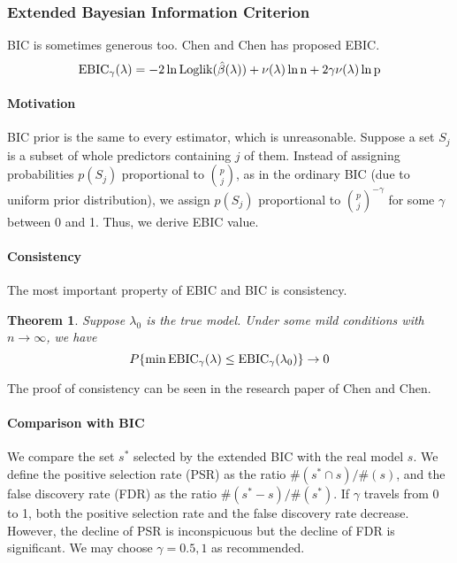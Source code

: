 \documentclass[]{article}
\newtheorem{mythm}{Theorem}%
\begin{document}
\subsubsection{Extended Bayesian Information Criterion}
BIC is sometimes generous too. Chen and Chen has proposed EBIC.
\begin{equation}
\rm EBIC_\gamma(\lambda)=-2\ln \rm Loglik(\hat{\beta}(\lambda))+\nu(\lambda) \ln n+2\gamma\nu(\lambda)\ln p
\end{equation}

\paragraph{Motivation}
BIC prior is the same to every estimator, which is unreasonable. Suppose a set $ S_j $ is a subset of whole predictors containing $ j $ of them. Instead of assigning probabilities $p(S_j)$ proportional to $ \binom{p}{j} $, as in the ordinary BIC (due to uniform prior distribution), we assign $p(S_j)$ proportional to $ \binom{p}{j}^{-\gamma} $ for some $\gamma$ between 0 and 1. Thus, we derive EBIC value.

\paragraph{Consistency}
The most important property of EBIC and BIC is consistency.
\begin{mythm}
	Suppose $ \lambda_0  $ is the true model. Under some mild conditions with $ n\rightarrow \infty $, we have
	\begin{equation}
	P\{\min \rm EBIC_\gamma (\lambda)\leq \rm EBIC_\gamma (\lambda_0) \}\rightarrow 0
	\end{equation}
\end{mythm}

The proof of consistency can be seen in the research paper of Chen and Chen\cite{chen2008extended}.

\paragraph{Comparison with BIC}
We compare the set $ s^* $ selected by the extended BIC with the real model $s$. We define the positive selection rate (PSR) as the ratio $\#(s^*\cap s)/\#(s)$, and the false discovery rate (FDR) as the ratio $\#(s^*-s)/\#(s^*)$. If $\gamma$ travels from 0 to 1, both the positive selection rate and the false discovery rate decrease. However, the decline of PSR is inconspicuous but the decline of FDR is significant. We may choose $ \gamma =0.5,1 $ as recommended.
\end{document}
